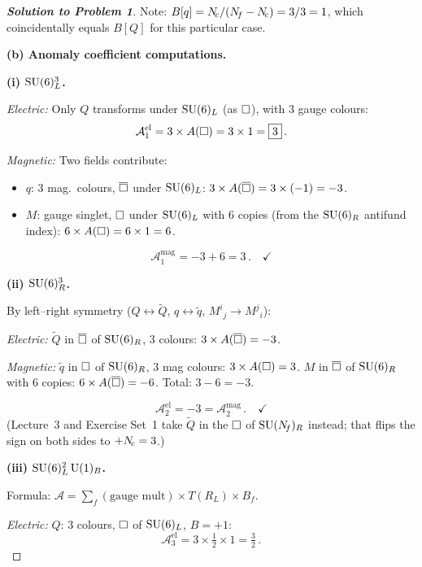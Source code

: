 \documentclass[11pt,a4paper]{article}
\begin{document}
\begin{proof}[\textbf{Solution to Problem 1}]
Note: $B[q] = N_{\!c}/(N_{\!f} - N_{\!c}) = 3/3 = 1$, which coincidentally equals
$B[Q]$ for this particular case.

\bigskip

\textbf{(b) Anomaly coefficient computations.}

\medskip

\textbf{(i) $\mathrm{SU}(6)_L^3$.}

\textit{Electric:} Only $Q$ transforms under $\mathrm{SU}(6)_L$
(as $\square$), with $3$ gauge colours:
\[
  \mathcal{A}^{\mathrm{el}}_1 = 3 \times A(\square)
  = 3 \times 1 = \boxed{3}\,.
\]

\textit{Magnetic:}  Two fields contribute:
\begin{itemize}
  \item $q$: $3$ mag.\ colours, $\overline{\square}$ under $\mathrm{SU}(6)_L$:
    $3 \times A(\overline{\square}) = 3 \times (-1) = -3$.
  \item $M$: gauge singlet, $\square$ under $\mathrm{SU}(6)_L$ with $6$ copies
    (from the $\mathrm{SU}(6)_R$ antifund index):
    $6 \times A(\square) = 6 \times 1 = 6$.
\end{itemize}
\[
  \mathcal{A}^{\mathrm{mag}}_1 = -3 + 6 = \boxed{3}\,.
  \quad\checkmark
\]

\medskip

\textbf{(ii) $\mathrm{SU}(6)_R^3$.}

By left--right symmetry ($Q \leftrightarrow \widetilde{Q}$,
$q \leftrightarrow \widetilde{q}$, $M^i{}_j \to M^j{}_i$):

\textit{Electric:} $\widetilde{Q}$ in $\overline{\square}$ of $\mathrm{SU}(6)_R$,
$3$ colours: $3 \times A(\overline{\square}) = -3$.

\textit{Magnetic:} $\widetilde{q}$ in $\square$ of $\mathrm{SU}(6)_R$, $3$ mag
colours: $3 \times A(\square) = 3$. $M$ in $\overline{\square}$ of $\mathrm{SU}(6)_R$
with $6$ copies: $6 \times A(\overline{\square}) = -6$. Total: $3 - 6 = -3$.

\[
  \mathcal{A}^{\mathrm{el}}_2 = -3 = \mathcal{A}^{\mathrm{mag}}_2\,.
  \quad\checkmark
\]
(Lecture~3 and Exercise Set~1 take $\widetilde{Q}$ in the $\square$ of
$\mathrm{SU}(N_{\!f})_R$ instead; that flips the sign on both sides to $+N_{\!c} = 3$.)

\medskip

\textbf{(iii) $\mathrm{SU}(6)_L^2\,\mathrm{U}(1)_B$.}

Formula: $\mathcal{A} = \sum_f (\text{gauge mult}) \times T(R_L) \times
B_f$.

\textit{Electric:} $Q$: $3$ colours, $\square$ of $\mathrm{SU}(6)_L$, $B = +1$:
\[
  \mathcal{A}^{\mathrm{el}}_3 = 3 \times \tfrac{1}{2} \times 1
  = \boxed{\tfrac{3}{2}}\,.
\]


\end{proof}
\end{document}
